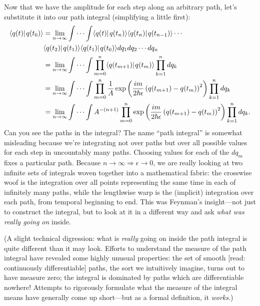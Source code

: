 \documentclass{amsart}
\newcommand{\md}{d}		%
\newcommand{\ket}[1]{\vert \hspace{1pt}#1\rangle}
\newcommand{\braket}[2]{\langle #1 \ket{#2}}
\newcommand{\qv}{q}
\begin{document}
Now that we have the amplitude for each step along an arbitrary path, let's substitute it into our path integral (simplifying a little first):
\begin{equation*}
\begin{split}
\braket{\qv(t)}{\qv(t_0)}
	&= \lim_{n\rightarrow\infty} \idotsint \braket{\qv(t)}{\qv(t_n)} \braket{\qv(t_n)}{\qv(t_{n-1})} \cdots\\
	& \braket{\qv(t_2)}{\qv(t_1)}\braket{\qv(t_1)}{\qv(t_0)} \md \qv_1 \md \qv_2 \cdots \md \qv_n\\
	&= \lim_{n\rightarrow\infty} \idotsint \prod_{m=0}^{n} \braket{\qv(t_{m+1})}{\qv(t_m)} \prod_{k=1}^{n} \md \qv_{k}\\
	&= \lim_{n\rightarrow\infty} \idotsint \prod_{m=0}^{n} \frac{1}{A} \exp{\left( \frac{i m}{2 \hbar \epsilon} \left(\qv(t_{m+1}) - \qv(t_m)\right)^2 \right)} \prod_{k=1}^{n} \md \qv_{k}\\
	&= \lim_{n\rightarrow\infty} \idotsint A^{-(n+1)} \prod_{m=0}^{n} \exp{\left( \frac{i m}{2 \hbar \epsilon} \left(\qv(t_{m+1}) - \qv(t_m)\right)^2 \right)} \prod_{k=1}^{n} \md \qv_{k}.\\
\end{split}
\end{equation*}
Can you see the paths in the integral?  The name ``path integral'' is somewhat misleading because we're integrating not over paths but over all possible values for each step in uncountably many paths.  Choosing values for each of the $\md \qv_m$ fixes a particular path.  Because $n\rightarrow\infty \Rightarrow \epsilon\rightarrow 0$, we are really looking at two infinite sets of integrals woven together into a mathematical fabric: the crosswise woof is the integration over all points representing the same time in each of infinitely many paths, while the lengthwise warp is the (implicit) integration over each path, from temporal beginning to end.  This was Feynman's insight---not just to construct the integral, but to look at it in a different way and ask \emph{what was really going on} inside.

(A slight technical digression: what is \emph{really} going on inside the path integral is quite different than it may look.  Efforts to understand the measure of the path integral have revealed some highly unusual properties: the set of smooth [read: continuously differentiable] paths, the sort we intuitively imagine, turns out to have measure zero; the integral is dominated by paths which are differentiable nowhere!  Attempts to rigorously formulate what the measure of the integral means have generally come up short---but as a formal definition, it \emph{works}.) 
\end{document}
